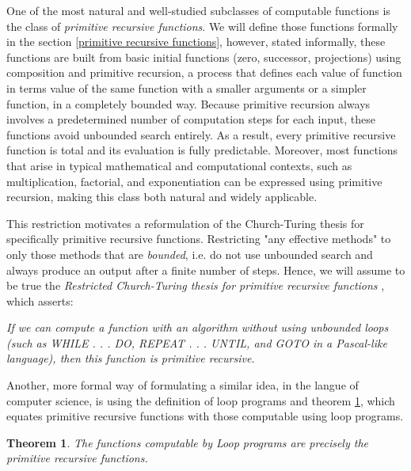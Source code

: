 \documentclass{pracalicmgr2025}
\theoremstyle{plain}            %
\newtheorem{theorem}{Theorem}[chapter]
\theoremstyle{remark}           %
\theoremstyle{definition}       %
\begin{document}
One of the most natural and well-studied subclasses of computable functions is the class of \textit{primitive recursive functions}. We will define those functions formally in the section \ref{primitive recursive functions}, however, stated informally, these functions are built from basic initial functions (zero, successor, projections) using composition and primitive recursion, a process that defines each value of function in terms value of the same function with a smaller arguments or a simpler function, in a completely bounded way. Because primitive recursion always involves a predetermined number of computation steps for each input, these functions avoid unbounded search entirely. As a result, every primitive recursive function is total and its evaluation is fully predictable. Moreover, most functions that arise in typical mathematical and computational contexts, such as multiplication, factorial, and exponentiation can be expressed using primitive recursion, making this class both natural and widely applicable.

This restriction motivates a reformulation of the Church-Turing thesis for specifically primitive recursive functions. Restricting "any effective methods" to only those methods that are \textit{bounded}, i.e. do not use unbounded search and always produce an output after a finite number of steps. Hence, we will assume to be true the \textit{Restricted Church-Turing thesis for primitive recursive functions} \cite{3}, which asserts: 
\begin{center}
    \textit{If we can compute a function with an algorithm without using unbounded loops (such as WHILE . . .
DO, REPEAT . . . UNTIL, and GOTO in a Pascal-like language), then this function
is primitive recursive.}
\end{center}

Another, more formal way of formulating a similar idea, in the langue of computer science, is using the definition of loop programs \cite{meyer1967complexity}  and theorem \ref{p.f and loop programs}, which equates primitive recursive functions with those computable using loop programs.

\begin{theorem} \label{p.f and loop programs}
    The functions computable by Loop programs are precisely the primitive
recursive functions.\cite{meyer1967complexity} 
\end{theorem}
\end{document}
